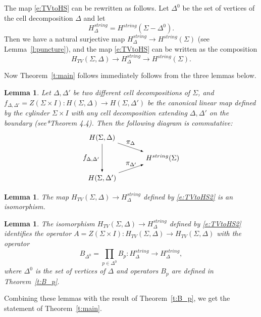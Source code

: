 \documentclass{amsart}
\newtheorem{lemma}[theorem]{Lemma}
\theoremstyle{definition}
\theoremstyle{remark}
\numberwithin{equation}{section}
\newcommand{\thref}[1]{Theorem~{\rm\ref{#1}}}
\newcommand{\leref}[1]{Lemma~{\rm\ref{#1}}}
\newcommand{\<}{\langle}
\renewcommand{\>}{\rangle}
\newcommand{\De}{\Delta}
\newcommand{\Si}{\Sigma}
\newcommand{\Hs}{H^{string}}
\newcommand{\HsD}{H^{string}_\De}
\newcommand{\HTV}{H_{TV}}
\begin{document}
The map \eqref{e:TVtoHS} can be rewritten as follows. Let $\De^0$ 
be the set of vertices of the cell decomposition $\De$  and let 
$$
\HsD=\Hs(\Si-\De^0).
$$
Then we have a natural surjective map $\HsD\to \Hs(\Si)$ (see
\leref{l:puncture}), and the map \eqref{e:TVtoHS} can be written as  the
composition 
\begin{equation}\label{e:TVtoHS2}
\HTV(\Si,\De)\to \HsD\to \Hs(\Si).
\end{equation}


Now \thref{t:main} follows immediately follows from the three lemmas below. 

\begin{lemma} \label{l:main1}
  Let $\De, \De'$ be two different cell decompositions of
  $\Si$, and $f_{\De,\De'}=Z(\Si\times I)\colon H(\Si,\De)\to H(\Si,\De')$ 
  be the canonical linear map defined by the cylinder $\Si\times I$ 
  with any cell decomposition extending $\De,\De'$ on the boundary 
  \textup{(}see*{Theorem 4.4}\textup{)}. Then 
  the following  diagram is commutative:
$$
\begin{tikzpicture}
\node (a) at (0, 0) {$H(\Si,\De)$};
\node (b) at (0, -2) {$H(\Si,\De')$};
\node (c) at (3, -1) {$\Hs(\Si)$};
\draw[->, >=latex] (a)--(b) node[pos=0.5,left] {$f_{\De,\De'}$};
\draw[->, >=latex] (a)--(c) node[pos=0.5,above] {$\pi_{\De}$};
\draw[->, >=latex] (b)--(c) node[pos=0.5,above] {$\pi_{\De'}$};
\end{tikzpicture}
$$
\end{lemma}

\begin{lemma}\label{l:main2}
   The map $\HTV(\Si,\De)\to \HsD$ defined by  \eqref{e:TVtoHS2} is an
   isomorphism.
\end{lemma}



\begin{lemma}\label{l:main3}
   The isomorphism  $\HTV(\Si,\De)\to \HsD$ defined by  
   \eqref{e:TVtoHS2} identifies the operator 
   $A=Z(\Si\times I)\colon \HTV(\Si,\De)\to \HTV(\Si,\De)$ with the operator 
   $$
   B_{\De^0}=\prod_{p\in \De^0} B_p\colon  \HsD\to \HsD,
   $$ 
   where 
   $\De^0$ is the set of vertices of $\De$ and operators $B_p$ are defined
   in \thref{t:B_p}.   
   \end{lemma}

Combining these lemmas with the result of \thref{t:B_p}, 
we get the statement of \thref{t:main}. 
\end{document}
